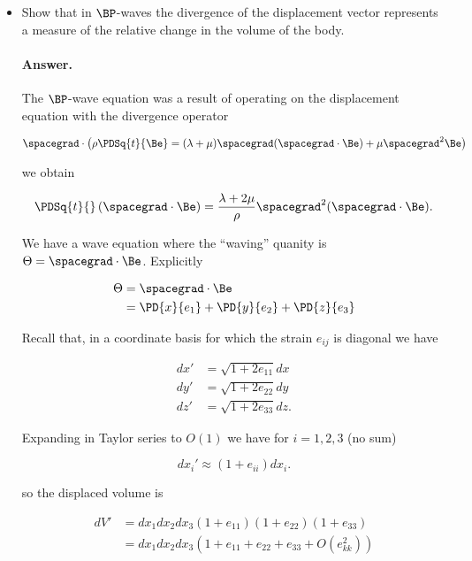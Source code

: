 \begin{itemize}
\item Show that in $\BP$-waves the divergence of the displacement vector represents a measure of the relative change in the volume of the body.

\paragraph{Answer.}
The $\BP$-wave equation was a result of operating on the displacement equation with the divergence operator

\begin{equation}\label{eqn:continuumMidTermReflection:10}
\spacegrad \cdot \left( 
\rho \PDSq{t}{\Be} = (\lambda + \mu) \spacegrad (\spacegrad \cdot \Be) + \mu \spacegrad^2 \Be
\right)
\end{equation}

we obtain

\begin{equation}\label{eqn:continuumMidTermReflection:30}
\PDSq{t}{} \left( \spacegrad \cdot \Be \right) = \frac{\lambda + 2 \mu}{\rho} \spacegrad^2 (\spacegrad \cdot \Be).
\end{equation}

We have a wave equation where the ``waving'' quanity is $\Theta = \spacegrad \cdot \Be$.  Explicitly

\begin{align*}
\Theta 
&= \spacegrad \cdot \Be \\
&= 
\PD{x}{e_1}
+\PD{y}{e_2}
+\PD{z}{e_3}
\end{align*}

Recall that, in a coordinate basis for which the strain $e_{ij}$ is diagonal we have

\begin{align}\label{eqn:continuumMidTermReflection:50}
dx' &= \sqrt{1 + 2 e_{11}} dx \\
dy' &= \sqrt{1 + 2 e_{22}} dy \\
dz' &= \sqrt{1 + 2 e_{33}} dz.
\end{align}

Expanding in Taylor series to $O(1)$ we have for $i = 1, 2, 3$ (no sum)

\begin{equation}\label{eqn:continuumMidTermReflection:70}
dx_i' \approx (1 + e_{ii}) dx_i.
\end{equation}

so the displaced volume is

\begin{align*}
dV' &= 
dx_1
dx_2
dx_3
(1 + e_{11})
(1 + e_{22})
(1 + e_{33}) \\
&=
dx_1
dx_2
dx_3
( 1  + e_{11} + e_{22} + e_{33} + O(e_{kk}^2) )
\end{align*}


\end{itemize}
